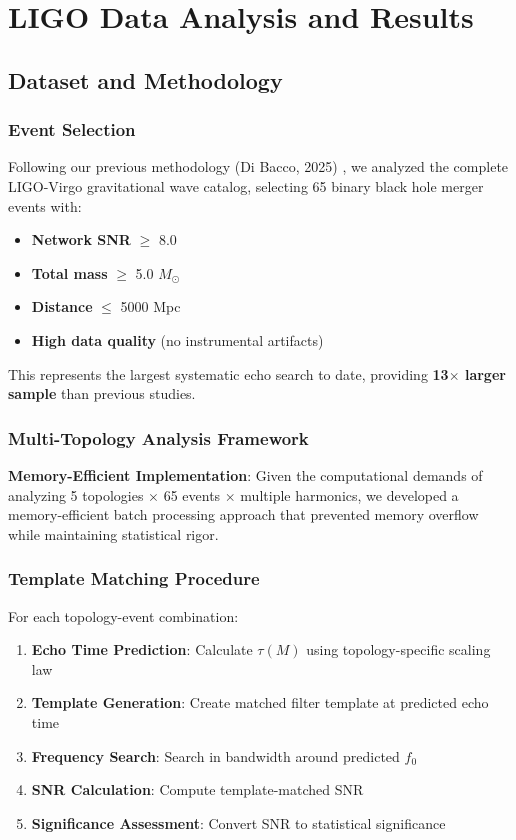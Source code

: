 \documentclass[11pt,a4paper]{article}
\newcommand{\Msun}{M_{\odot}}
\begin{document}
\section{LIGO Data Analysis and Results}

\subsection{Dataset and Methodology}

\subsubsection{Event Selection}

Following our previous methodology (Di Bacco, 2025) \cite{dibacco2025}, we analyzed the complete LIGO-Virgo gravitational wave catalog, selecting 65 binary black hole merger events with:

\begin{itemize}
    \item \textbf{Network SNR} $\geq$ 8.0
    \item \textbf{Total mass} $\geq$ 5.0 $\Msun$
    \item \textbf{Distance} $\leq$ 5000 Mpc
    \item \textbf{High data quality} (no instrumental artifacts)
\end{itemize}

This represents the largest systematic echo search to date, providing \textbf{13$\times$ larger sample} than previous studies.

\subsubsection{Multi-Topology Analysis Framework}

\textbf{Memory-Efficient Implementation}: Given the computational demands of analyzing 5 topologies $\times$ 65 events $\times$ multiple harmonics, we developed a memory-efficient batch processing approach that prevented memory overflow while maintaining statistical rigor.

\subsubsection{Template Matching Procedure}

For each topology-event combination:
\begin{enumerate}
    \item \textbf{Echo Time Prediction}: Calculate $\tau(M)$ using topology-specific scaling law
    \item \textbf{Template Generation}: Create matched filter template at predicted echo time
    \item \textbf{Frequency Search}: Search in bandwidth around predicted $f_0$
    \item \textbf{SNR Calculation}: Compute template-matched SNR
    \item \textbf{Significance Assessment}: Convert SNR to statistical significance
\end{enumerate}
\end{document}

